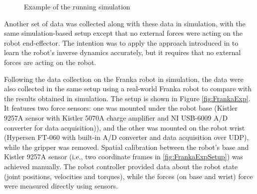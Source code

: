 \begin{figure}
    \centering
    \hfill
    \caption{Example of the running simulation}
    \label{fig:Coppelia}
\end{figure}

Another set of data was collected along with these data in simulation, with the same simulation-based setup except that no external forces were acting on the robot end-effector. The intention was to apply the approach introduced in \cite{Lutter2019} to learn the robot's inverse dynamics accurately, but it requires that no external forces are acting on the robot.

Following the data collection on the Franka robot in simulation, the data were also collected in the same setup using a real-world Franka robot to compare with the results obtained in simulation. The setup is shown in Figure \ref{fig:FrankaExp}. It features two force sensors: one was mounted under the robot base (Kistler 9257A sensor with Kistler 5070A charge amplifier and NI USB-6009 A/D converter for data acquisition)), and the other was mounted on the robot wrist (Hypersen FT-060 with built-in A/D converter and data acquisition over UDP), while the gripper was removed. Spatial calibration between the robot’s base and Kistler 9257A sensor (i.e., two coordinate frames in \cref{fig:FrankaExpSetup}) was achieved manually. The robot controller provided data about the robot state (joint positions, velocities and torques), while the forces (on base and wrist) force were measured directly using sensors.

